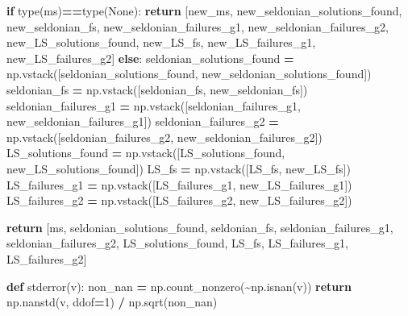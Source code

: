 \documentclass[12pt, twoside]{amherstthesis}
\newenvironment{Shaded}{\begin{snugshade}}{\end{snugshade}}
\newcommand{\BuiltInTok}[1]{#1}
\newcommand{\ControlFlowTok}[1]{\textcolor[rgb]{0.13,0.29,0.53}{\textbf{#1}}}
\newcommand{\DecValTok}[1]{\textcolor[rgb]{0.00,0.00,0.81}{#1}}
\newcommand{\KeywordTok}[1]{\textcolor[rgb]{0.13,0.29,0.53}{\textbf{#1}}}
\newcommand{\NormalTok}[1]{#1}
\newcommand{\OperatorTok}[1]{\textcolor[rgb]{0.81,0.36,0.00}{\textbf{#1}}}
\newcommand{\VariableTok}[1]{\textcolor[rgb]{0.00,0.00,0.00}{#1}}
\begin{document}
\begin{Shaded}
\begin{Highlighting}[]
    \ControlFlowTok{if} \BuiltInTok{type}\NormalTok{(ms)}\OperatorTok{==}\BuiltInTok{type}\NormalTok{(}\VariableTok{None}\NormalTok{):}
        \ControlFlowTok{return}\NormalTok{ [new\_ms, new\_seldonian\_solutions\_found, new\_seldonian\_fs,}
\NormalTok{      new\_seldonian\_failures\_g1, new\_seldonian\_failures\_g2,}
\NormalTok{      new\_LS\_solutions\_found, new\_LS\_fs, new\_LS\_failures\_g1, }
\NormalTok{      new\_LS\_failures\_g2]}
    \ControlFlowTok{else}\NormalTok{:}
\NormalTok{        seldonian\_solutions\_found  }\OperatorTok{=} 
\NormalTok{        np.vstack([seldonian\_solutions\_found, new\_seldonian\_solutions\_found])}
\NormalTok{        seldonian\_fs               }\OperatorTok{=} 
\NormalTok{        np.vstack([seldonian\_fs,              new\_seldonian\_fs])}
\NormalTok{        seldonian\_failures\_g1      }\OperatorTok{=} 
\NormalTok{        np.vstack([seldonian\_failures\_g1,     new\_seldonian\_failures\_g1])}
\NormalTok{        seldonian\_failures\_g2      }\OperatorTok{=} 
\NormalTok{        np.vstack([seldonian\_failures\_g2,     new\_seldonian\_failures\_g2])}
\NormalTok{        LS\_solutions\_found         }\OperatorTok{=} 
\NormalTok{        np.vstack([LS\_solutions\_found,        new\_LS\_solutions\_found])}
\NormalTok{        LS\_fs                      }\OperatorTok{=} 
\NormalTok{        np.vstack([LS\_fs,                     new\_LS\_fs])}
\NormalTok{        LS\_failures\_g1             }\OperatorTok{=} 
\NormalTok{        np.vstack([LS\_failures\_g1,            new\_LS\_failures\_g1])}
\NormalTok{        LS\_failures\_g2             }\OperatorTok{=} 
\NormalTok{        np.vstack([LS\_failures\_g2,            new\_LS\_failures\_g2])}

        \ControlFlowTok{return}\NormalTok{ [ms, seldonian\_solutions\_found, seldonian\_fs, seldonian\_failures\_g1,}
\NormalTok{      seldonian\_failures\_g2, LS\_solutions\_found, LS\_fs, LS\_failures\_g1, LS\_failures\_g2]}
\end{Highlighting}
\end{Shaded}
\begin{Shaded}
\begin{Highlighting}[]
\KeywordTok{def}\NormalTok{ stderror(v):}
\NormalTok{    non\_nan }\OperatorTok{=}\NormalTok{ np.count\_nonzero(}\OperatorTok{\textasciitilde{}}\NormalTok{np.isnan(v))        }
    \ControlFlowTok{return}\NormalTok{ np.nanstd(v, ddof}\OperatorTok{=}\DecValTok{1}\NormalTok{) }\OperatorTok{/}\NormalTok{ np.sqrt(non\_nan)}
\end{Highlighting}
\end{Shaded}
\end{document}

